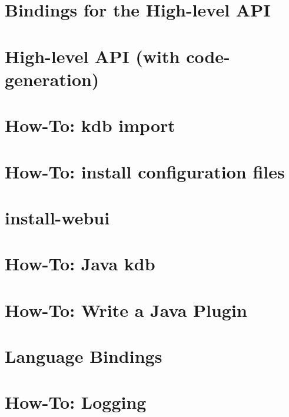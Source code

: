 \let\mypdfximage\pdfximage\def\pdfximage{\immediate\mypdfximage}\documentclass[twoside]{book}
\newcommand{\+}{\discretionary{\mbox{\scriptsize$\hookleftarrow$}}{}{}}
\begin{document}
\chapter{Bindings for the High-\/level API}
\label{doc_tutorials_highlevel-bindings_md}

\chapter{High-\/level API (with code-\/generation)}
\label{doc_tutorials_highlevel_md}

\chapter{How-\/\+To\+: kdb import}
\label{doc_tutorials_import_md}

\chapter{How-\/\+To\+: install configuration files}
\label{doc_tutorials_install-config-files_md}

\chapter{install-\/webui}
\label{md_doc_tutorials_install_webui}

\chapter{How-\/\+To\+: Java kdb}
\label{doc_tutorials_java-kdb_md}

\chapter{How-\/\+To\+: Write a Java Plugin}
\label{doc_tutorials_java-plugins_md}

\chapter{Language Bindings}
\label{doc_tutorials_language-bindings_md}

\chapter{How-\/\+To\+: Logging}
\label{doc_tutorials_logger_md}

\end{document}

